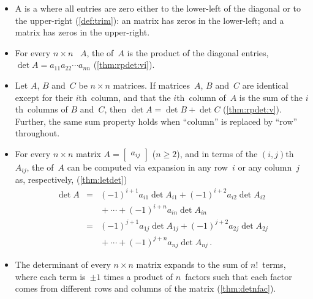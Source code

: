 \begin{itemize}
\item A  is a  where all entries are zero either to the lower-left of the diagonal or to the upper-right (\autoref{def:trim}): an  matrix has zeros in the lower-left; and a  matrix has zeros in the upper-right.

\item For every \(n\times n\) ~\(A\),
the  of~\(A\) is the product of the diagonal entries, \(\det A=a_{11}a_{22}\cdots a_{nn}\) (\autoref{thm:rpdet:vi}).

\item Let \(A\), \(B\) and~\(C\) be \(n\times n\) matrices.
If matrices~\(A\), \(B\) and~\(C\) are identical except for their \(i\)th~column, and that the \(i\)th~column of~\(A\) is the sum of the \(i\)th~columns of \(B\) and~\(C\), then \(\det A=\det B+\det C\) (\autoref{thm:rpdet:v}).
Further, the same sum property holds when ``column'' is replaced by ``row'' throughout.

\item For every \(n\times n\) matrix \(A=\begin{bmatrix} a_{ij} \end{bmatrix}\) (\(n\geq2\)), and in terms of the \((i,j)\)th ~\(A_{ij}\), the  of~\(A\) can be computed via expansion in any row~\(i\) or any column~\(j\) as, respectively, (\autoref{thm:letdet})
\begin{eqnarray*}
\det A
&=&(-1)^{i+1}a_{i1}\det A_{i1}
+(-1)^{i+2}a_{i2}\det A_{i2}
\nonumber\\&&{}
+\cdots+(-1)^{i+n}a_{in}\det A_{in}
\nonumber\\&=&(-1)^{j+1}a_{1j}\det A_{1j}
+(-1)^{j+2}a_{2j}\det A_{2j}
\nonumber\\&&{}
+\cdots+(-1)^{j+n}a_{nj}\det A_{nj}\,.
\end{eqnarray*}

\item The determinant of every \(n\times n\) matrix expands to the sum of \(n!\)~terms, where each term is~\(\pm1\) times a product of \(n\)~factors such that each factor comes from different rows and columns of the matrix (\autoref{thm:detnfac}).



\end{itemize}



\makeanswers
